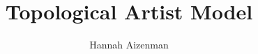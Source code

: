 \documentclass[letterpaper,onecolumn,titlepage]{Ythesis}
\title{Topological Artist Model}
\author{Hannah Aizenman}
\newcommand{\note}[1]{\textcolor{Magenta}{#1}}
\begin{document}
\makefrontmatter




\printbibliography
\end{document}
